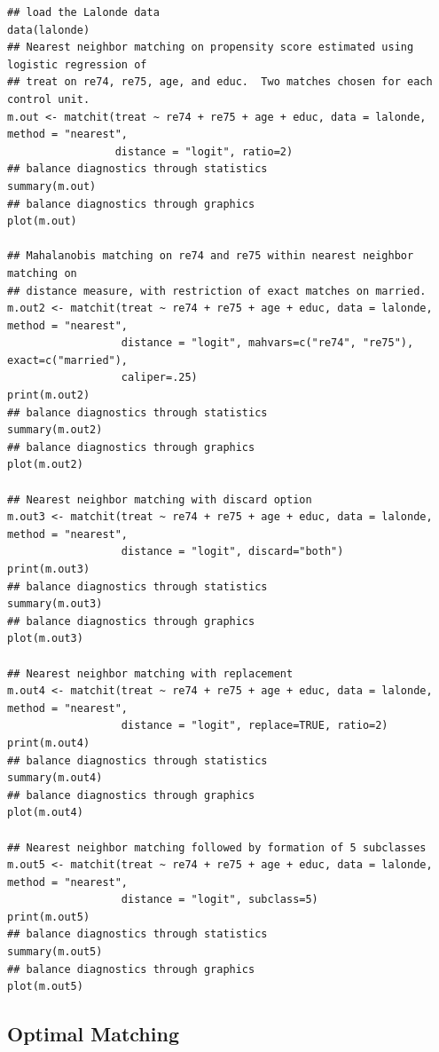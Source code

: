 \documentclass[oneside,letterpaper,titlepage]{article}
\begin{document}
\begin{verbatim}
## load the Lalonde data
data(lalonde)
## Nearest neighbor matching on propensity score estimated using logistic regression of
## treat on re74, re75, age, and educ.  Two matches chosen for each control unit.
m.out <- matchit(treat ~ re74 + re75 + age + educ, data = lalonde, method = "nearest", 
                 distance = "logit", ratio=2)
## balance diagnostics through statistics
summary(m.out)
## balance diagnostics through graphics
plot(m.out)

## Mahalanobis matching on re74 and re75 within nearest neighbor matching on 
## distance measure, with restriction of exact matches on married.
m.out2 <- matchit(treat ~ re74 + re75 + age + educ, data = lalonde, method = "nearest", 
                  distance = "logit", mahvars=c("re74", "re75"), exact=c("married"), 
                  caliper=.25)
print(m.out2)
## balance diagnostics through statistics
summary(m.out2)
## balance diagnostics through graphics
plot(m.out2)

## Nearest neighbor matching with discard option
m.out3 <- matchit(treat ~ re74 + re75 + age + educ, data = lalonde, method = "nearest", 
                  distance = "logit", discard="both")
print(m.out3)
## balance diagnostics through statistics
summary(m.out3)
## balance diagnostics through graphics
plot(m.out3)

## Nearest neighbor matching with replacement
m.out4 <- matchit(treat ~ re74 + re75 + age + educ, data = lalonde, method = "nearest", 
                  distance = "logit", replace=TRUE, ratio=2)
print(m.out4)
## balance diagnostics through statistics
summary(m.out4)
## balance diagnostics through graphics
plot(m.out4)

## Nearest neighbor matching followed by formation of 5 subclasses
m.out5 <- matchit(treat ~ re74 + re75 + age + educ, data = lalonde, method = "nearest", 
                  distance = "logit", subclass=5)
print(m.out5)
## balance diagnostics through statistics
summary(m.out5)
## balance diagnostics through graphics
plot(m.out5)
\end{verbatim}

\subsection{Optimal Matching}
\label{optmatch}
\end{document}
